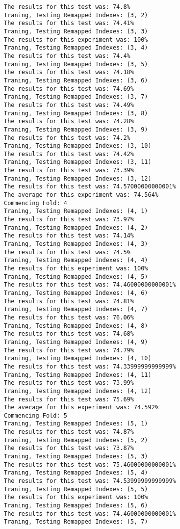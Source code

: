 \begin{lstlisting}[basicstyle=\tiny]
The results for this test was: 74.8%
Traning, Testing Remapped Indexes: (3, 2)
The results for this test was: 74.41%
Traning, Testing Remapped Indexes: (3, 3)
The results for this experiment was: 100%
Traning, Testing Remapped Indexes: (3, 4)
The results for this test was: 74.4%
Traning, Testing Remapped Indexes: (3, 5)
The results for this test was: 74.18%
Traning, Testing Remapped Indexes: (3, 6)
The results for this test was: 74.69%
Traning, Testing Remapped Indexes: (3, 7)
The results for this test was: 74.49%
Traning, Testing Remapped Indexes: (3, 8)
The results for this test was: 74.28%
Traning, Testing Remapped Indexes: (3, 9)
The results for this test was: 74.2%
Traning, Testing Remapped Indexes: (3, 10)
The results for this test was: 74.42%
Traning, Testing Remapped Indexes: (3, 11)
The results for this test was: 73.39%
Traning, Testing Remapped Indexes: (3, 12)
The results for this test was: 74.57000000000001%
The average for this experiment was: 74.564%
Commencing Fold: 4
Traning, Testing Remapped Indexes: (4, 1)
The results for this test was: 73.97%
Traning, Testing Remapped Indexes: (4, 2)
The results for this test was: 74.14%
Traning, Testing Remapped Indexes: (4, 3)
The results for this test was: 74.5%
Traning, Testing Remapped Indexes: (4, 4)
The results for this experiment was: 100%
Traning, Testing Remapped Indexes: (4, 5)
The results for this test was: 74.46000000000001%
Traning, Testing Remapped Indexes: (4, 6)
The results for this test was: 74.81%
Traning, Testing Remapped Indexes: (4, 7)
The results for this test was: 76.06%
Traning, Testing Remapped Indexes: (4, 8)
The results for this test was: 74.68%
Traning, Testing Remapped Indexes: (4, 9)
The results for this test was: 74.79%
Traning, Testing Remapped Indexes: (4, 10)
The results for this test was: 74.33999999999999%
Traning, Testing Remapped Indexes: (4, 11)
The results for this test was: 73.99%
Traning, Testing Remapped Indexes: (4, 12)
The results for this test was: 75.69%
The average for this experiment was: 74.592%
Commencing Fold: 5
Traning, Testing Remapped Indexes: (5, 1)
The results for this test was: 74.87%
Traning, Testing Remapped Indexes: (5, 2)
The results for this test was: 73.87%
Traning, Testing Remapped Indexes: (5, 3)
The results for this test was: 75.46000000000001%
Traning, Testing Remapped Indexes: (5, 4)
The results for this test was: 74.53999999999999%
Traning, Testing Remapped Indexes: (5, 5)
The results for this experiment was: 100%
Traning, Testing Remapped Indexes: (5, 6)
The results for this test was: 74.46000000000001%
Traning, Testing Remapped Indexes: (5, 7)

\end{lstlisting}
